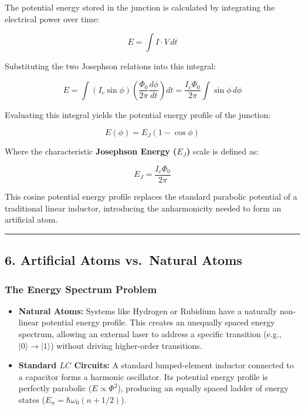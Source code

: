 \documentclass[
]{article}
\providecommand{\tightlist}{%
  \setlength{\itemsep}{0pt}\setlength{\parskip}{0pt}}
\begin{document}
The potential energy stored in the junction is calculated by integrating
the electrical power over time:

\[E = \int I \cdot V \, dt\]

Substituting the two Josephson relations into this integral:

\[E = \int \left(I_c \sin \phi\right) \left(\frac{\Phi_0}{2\pi} \frac{d\phi}{dt}\right) dt = \frac{I_c \Phi_0}{2\pi} \int \sin \phi \, d\phi\]

Evaluating this integral yields the potential energy profile of the
junction:

\[E(\phi) = E_J (1 - \cos \phi)\]

Where the characteristic \textbf{Josephson Energy (\(E_J\))} scale is
defined as:

\[E_J = \frac{I_c \Phi_0}{2\pi}\]

This cosine potential energy profile replaces the standard parabolic
potential of a traditional linear inductor, introducing the
anharmonicity needed to form an artificial atom.

\begin{center}\rule{0.5\linewidth}{0.5pt}\end{center}

\subsection{6. Artificial Atoms vs.~Natural
Atoms}\label{artificial-atoms-vs.-natural-atoms}

\subsubsection{The Energy Spectrum
Problem}\label{the-energy-spectrum-problem}

\begin{itemize}
\tightlist
\item
  \textbf{Natural Atoms:} Systems like Hydrogen or Rubidium have a
  naturally non-linear potential energy profile. This creates an
  unequally spaced energy spectrum, allowing an external laser to
  address a specific transition (e.g., \(|0\rangle \to |1\rangle\))
  without driving higher-order transitions.
\item
  \textbf{Standard \(LC\) Circuits:} A standard lumped-element inductor
  connected to a capacitor forms a harmonic oscillator. Its potential
  energy profile is perfectly parabolic (\(E \propto \Phi^2\)),
  producing an equally spaced ladder of energy states
  (\(E_n = \hbar\omega_0(n + 1/2)\)).
\end{itemize}
\end{document}
